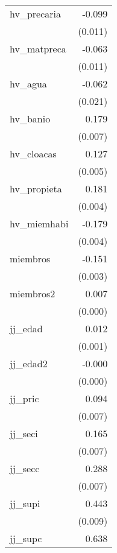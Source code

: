 {\begin{longtable}{l*{1}{D{.}{.}{-1}}}
\addlinespace
hv\_precaria &      -0.099\sym{***}\\
            &     (0.011)         \\
\addlinespace
hv\_matpreca &      -0.063\sym{***}\\
            &     (0.011)         \\
\addlinespace
hv\_agua     &      -0.062\sym{**} \\
            &     (0.021)         \\
\addlinespace
hv\_banio    &       0.179\sym{***}\\
            &     (0.007)         \\
\addlinespace
hv\_cloacas  &       0.127\sym{***}\\
            &     (0.005)         \\
\addlinespace
hv\_propieta &       0.181\sym{***}\\
            &     (0.004)         \\
\addlinespace
hv\_miemhabi &      -0.179\sym{***}\\
            &     (0.004)         \\
\addlinespace
miembros    &      -0.151\sym{***}\\
            &     (0.003)         \\
\addlinespace
miembros2   &       0.007\sym{***}\\
            &     (0.000)         \\
\addlinespace
jj\_edad     &       0.012\sym{***}\\
            &     (0.001)         \\
\addlinespace
jj\_edad2    &      -0.000\sym{***}\\
            &     (0.000)         \\
\addlinespace
jj\_pric     &       0.094\sym{***}\\
            &     (0.007)         \\
\addlinespace
jj\_seci     &       0.165\sym{***}\\
            &     (0.007)         \\
\addlinespace
jj\_secc     &       0.288\sym{***}\\
            &     (0.007)         \\
\addlinespace
jj\_supi     &       0.443\sym{***}\\
            &     (0.009)         \\
\addlinespace
jj\_supc     &       0.638\sym{***}\\

\end{longtable}}
